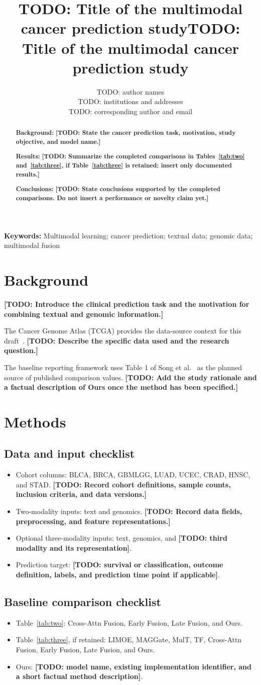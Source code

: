 \documentclass[pdflatex,sn-vancouver-num]{sn-jnl}
\title[Multimodal cancer prediction]{TODO: Title of the multimodal
  cancer prediction study}
\author*[1]{\fnm{TODO} \sur{Author}}
\affil*[1]{\orgname{TODO: institution},
    \orgaddress{TODO: full institutional address}}
\title{TODO: Title of the multimodal cancer prediction study}
\author{TODO: author names\\TODO: institutions and addresses\\
    TODO: corresponding author and email}
\date{}
\newcommand{\TODO}[1]{\textbf{[TODO: #1]}}
\newcommand{\draftabstract}{%
  \textbf{Background:} \TODO{State the cancer prediction task, motivation,
  study objective, and model name.}\par
  \textbf{Results:} \TODO{Summarize the completed comparisons in
  Tables~\ref{tab:two} and~\ref{tab:three}, if Table~\ref{tab:three} is
  retained; insert only documented results.}\par
  \textbf{Conclusions:} \TODO{State conclusions supported by the completed
  comparisons. Do not insert a performance or novelty claim yet.}}
\newcommand{\draftkeywords}{Multimodal learning; cancer prediction;
  textual data; genomic data; multimodal fusion}
\begin{document}
\maketitle
\ifSNtemplate\else
  \begin{abstract}
    \draftabstract
  \end{abstract}
  \noindent\textbf{Keywords:} \draftkeywords
\fi

\section{Background}
\TODO{Introduce the clinical prediction task and the motivation for
combining textual and genomic information.}

The Cancer Genome Atlas (TCGA) provides the data-source context for this
draft~\cite{tcga2013pan_cancer}.
\TODO{Describe the specific data used and the research question.}

The baseline reporting framework uses Table 1 of Song et
al.~\cite{song2026cancer_type_aware} as the planned source of published
comparison values.
\TODO{Add the study rationale and a factual description of Ours once
the method has been specified.}

\section{Methods}
\label{sec:methods}

\subsection{Data and input checklist}
\begin{itemize}
  \item Cohort columns: BLCA, BRCA, GBMLGG, LUAD, UCEC, CRAD, HNSC,
  and STAD. \TODO{Record cohort definitions, sample counts, inclusion
  criteria, and data versions.}
  \item Two-modality inputs: text and genomics.
  \TODO{Record data fields, preprocessing, and feature representations.}
  \item Optional three-modality inputs: text, genomics, and
  \TODO{third modality and its representation}.
  \item Prediction target: \TODO{survival or classification, outcome
  definition, labels, and prediction time point if applicable}.
\end{itemize}

\subsection{Baseline comparison checklist}
\begin{itemize}
  \item Table~\ref{tab:two}: Cross-Attn Fusion, Early Fusion,
  Late Fusion, and Ours.
  \item Table~\ref{tab:three}, if retained: LIMOE, MAGGate, MulT,
  TF, Cross-Attn Fusion, Early Fusion, Late Fusion, and Ours.
  \item Ours: \TODO{model name, existing implementation identifier,
  and a short factual method description}.
\end{itemize}
\end{document}
